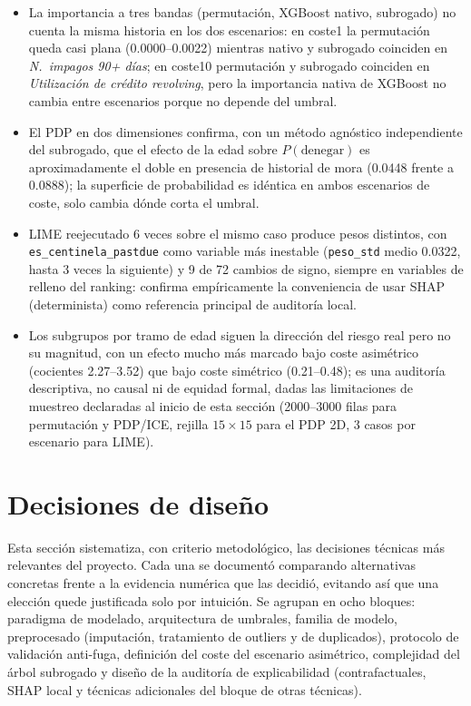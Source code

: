 \documentclass[11pt,a4paper]{article}
\begin{document}
\begin{itemize}
\item La importancia a tres bandas (permutación, XGBoost nativo, subrogado) no cuenta la misma historia en
los dos escenarios: en coste1 la permutación queda casi plana (0.0000--0.0022) mientras nativo y subrogado
coinciden en \emph{N.\ impagos 90+ días}; en coste10 permutación y subrogado coinciden en \emph{Utilización
de crédito revolving}, pero la importancia nativa de XGBoost no cambia entre escenarios porque no depende
del umbral.
\item El PDP en dos dimensiones confirma, con un método agnóstico independiente del subrogado, que el
efecto de la edad sobre $P(\text{denegar})$ es aproximadamente el doble en presencia de historial de mora
(0.0448 frente a 0.0888); la superficie de probabilidad es idéntica en ambos escenarios de coste, solo
cambia dónde corta el umbral.
\item LIME reejecutado 6 veces sobre el mismo caso produce pesos distintos, con \texttt{es\_centinela\_pastdue}
como variable más inestable (\texttt{peso\_std} medio 0.0322, hasta 3 veces la siguiente) y 9 de 72 cambios
de signo, siempre en variables de relleno del ranking: confirma empíricamente la conveniencia de usar SHAP
(determinista) como referencia principal de auditoría local.
\item Los subgrupos por tramo de edad siguen la dirección del riesgo real pero no su magnitud, con un efecto
mucho más marcado bajo coste asimétrico (cocientes 2.27--3.52) que bajo coste simétrico (0.21--0.48); es una
auditoría descriptiva, no causal ni de equidad formal, dadas las limitaciones de muestreo declaradas al
inicio de esta sección (2000--3000 filas para permutación y PDP/ICE, rejilla $15\times 15$ para el PDP 2D, 3
casos por escenario para LIME).
\end{itemize}

\section{Decisiones de diseño}

Esta sección sistematiza, con criterio metodológico, las decisiones técnicas más relevantes del
proyecto. Cada una se documentó comparando alternativas concretas frente a la evidencia numérica
que las decidió, evitando así que una elección quede justificada solo por intuición. Se agrupan en
ocho bloques: paradigma de modelado, arquitectura de umbrales, familia de modelo, preprocesado
(imputación, tratamiento de outliers y de duplicados), protocolo de validación anti-fuga, definición
del coste del escenario asimétrico, complejidad del árbol subrogado y diseño de la auditoría de
explicabilidad (contrafactuales, SHAP local y técnicas adicionales del bloque de otras técnicas).
\end{document}
